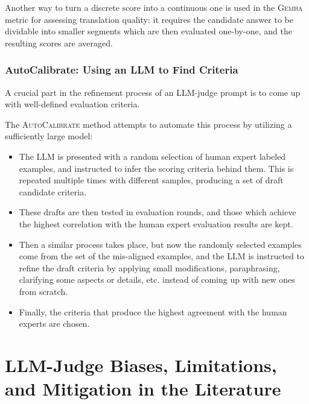 \documentclass[noindent,nohyp,parspace,titlepage,twoside,12pt]{article}
\begin{document}
        Another way to turn a discrete score into a continuous one is used
        in the \textsc{Gemba} metric \cite{gemba} for assessing translation
        quality: it requires the candidate answer to be dividable into smaller
        segments which are then evaluated one-by-one, and the resulting scores
        are averaged.

      \subsubsection{AutoCalibrate: Using an LLM to Find Criteria}

        A crucial part in the refinement process of an LLM-judge prompt is to
        come up with well-defined evaluation criteria.

        The \textsc{AutoCalibrate} method \cite{autocal} attempts to automate
        this process by utilizing a sufficiently large model:

        \begin{itemize}
          \item The LLM is presented with a random selection of human expert
                labeled examples, and instructed to infer the scoring
                criteria behind them. This is repeated multiple times with
                different samples, producing a set of draft candidate criteria.

          \item These drafts are then tested in evaluation rounds, and those
                which achieve the highest correlation with the human expert
                evaluation results are kept.

          \item Then a similar process takes place, but now the randomly
                selected examples come from the set of the mis-aligned
                examples, and the LLM is instructed to refine the draft
                criteria by applying small modifications, paraphrasing,
                clarifying some aspects or details, etc. instead of coming up
                with new ones from scratch.

          \item Finally, the criteria that produce the highest agreement with
                the human experts are chosen.
      \end{itemize}

  \section{LLM-Judge Biases, Limitations, and Mitigation in the Literature}
\end{document}
